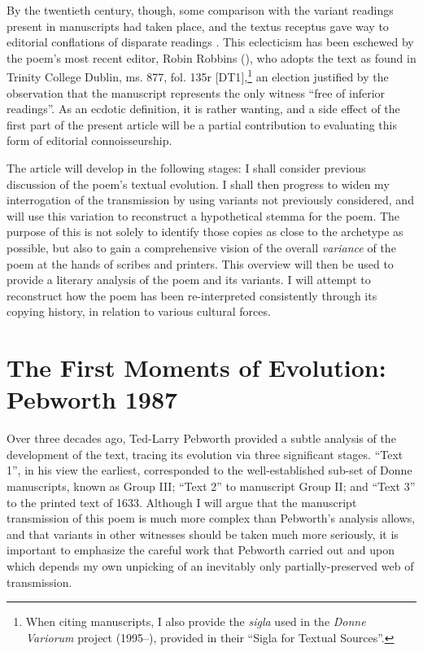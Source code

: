 \begin{paper}
By the twentieth century, though, some comparison with the variant
readings present in manuscripts had taken place, and the textus receptus
gave way to editorial conflations of disparate readings \citep[see][nn. 6--7, at 26--27]{pebworth_editor_1987}. This eclecticism has been eschewed by the
poem's most recent editor, Robin Robbins (\citeyear[654--56]{robbins_complete_2013}), who adopts
the text as found in Trinity College Dublin, ms. 877, fol. 135r
{[}DT1{]},\footnote{When citing manuscripts, I also provide the
  \emph{sigla} used in the \emph{Donne Variorum} project (1995--),
  provided in their ``Sigla for Textual Sources''.} an election
justified by the observation that the manuscript represents the only
witness ``free of inferior readings''. As an ecdotic definition, it is
rather wanting, and a side effect of the first part of the present
article will be a partial contribution to evaluating this form of
editorial connoisseurship.

The article will develop in the following stages: I shall consider
previous discussion of the poem's textual evolution. I shall then
progress to widen my interrogation of the transmission by using variants
not previously considered, and will use this variation to reconstruct a
hypothetical stemma for the poem. The purpose of this is not solely to
identify those copies as close to the archetype as possible, but also to
gain a comprehensive vision of the overall \emph{variance} of the poem
at the hands of scribes and printers. This overview will then be used to
provide a literary analysis of the poem and its variants. I will attempt
to reconstruct how the poem has been re-interpreted consistently through
its copying history, in relation to various cultural forces.

\section{The First Moments of Evolution: Pebworth 1987}

Over three decades ago, Ted-Larry Pebworth provided a subtle analysis of
the development of the text, tracing its evolution via three significant
stages. ``Text 1'', in his view the earliest, corresponded to the
well-established sub-set of Donne manuscripts, known as Group III;
``Text 2'' to manuscript Group II; and ``Text 3'' to the printed text of
1633. Although I will argue that the manuscript transmission of this
poem is much more complex than Pebworth's analysis allows, and that
variants in other witnesses should be taken much more seriously, it is
important to emphasize the careful work that Pebworth carried out and
upon which depends my own unpicking of an inevitably only
partially-preserved web of transmission.


\end{paper}
